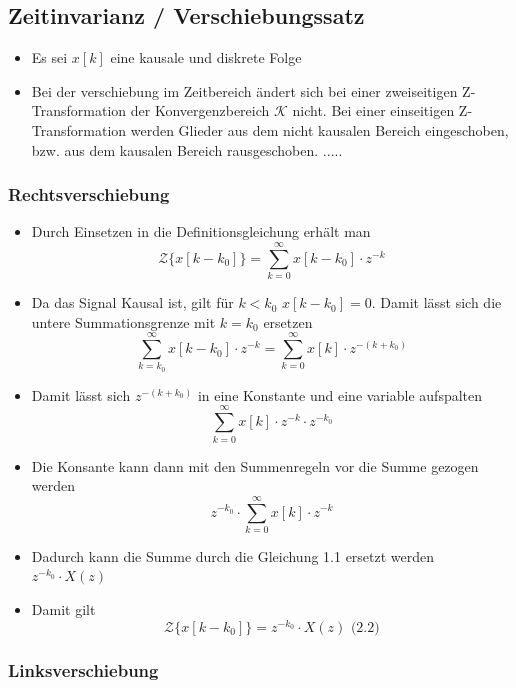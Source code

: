 \documentclass[11pt]{article}
\def\lt{<}
\begin{document}
    \subsection{Zeitinvarianz /
Verschiebungssatz}\label{zeitinvarianz-verschiebungssatz}

\begin{itemize}
\item
  Es sei \(x[k]\) eine kausale und diskrete Folge
\item
  Bei der verschiebung im Zeitbereich ändert sich bei einer zweiseitigen
  Z-Transformation der Konvergenzbereich \(\mathcal{K}\) nicht. Bei
  einer einseitigen Z-Transformation werden Glieder aus dem nicht
  kausalen Bereich eingeschoben, bzw. aus dem kausalen Bereich
  rausgeschoben. .....
\end{itemize}

\subsubsection{Rechtsverschiebung}\label{rechtsverschiebung}

\begin{itemize}
\item
  Durch Einsetzen in die Definitionsgleichung erhält man
  \[\mathcal{Z}\{x[k-k_0]\} = \sum_{k=0}^\infty x[k-k_0] \cdot z^{-k}\]
\item
  Da das Signal Kausal ist, gilt für \(k \lt k_0\) \(x[k-k_0] = 0\).
  Damit lässt sich die untere Summationsgrenze mit \(k=k_0\) ersetzen
  \[\sum_{k=k_0}^\infty x[k-k_0] \cdot z^{-k} = \sum_{k=0}^\infty x[k] \cdot z^{-(k+k_0)}\]
\item
  Damit lässt sich \(z^{-(k+k_0)}\) in eine Konstante und eine variable
  aufspalten \[\sum_{k=0}^\infty x[k] \cdot z^{-k} \cdot z^{-k_0}\]
\item
  Die Konsante kann dann mit den Summenregeln vor die Summe gezogen
  werden \[z^{-k_0} \cdot \sum_{k=0}^\infty x[k] \cdot z^{-k}\]
\item
  Dadurch kann die Summe durch die Gleichung 1.1 ersetzt werden
  \(z^{-k_0} \cdot X(z)\)
\item
  Damit gilt
  \[\mathcal{Z}\{x[k-k_0]\} = z^{-k_0} \cdot X(z)\textrm{  (2.2)}\]
\end{itemize}

\subsubsection{Linksverschiebung}\label{linksverschiebung}
\end{document}
